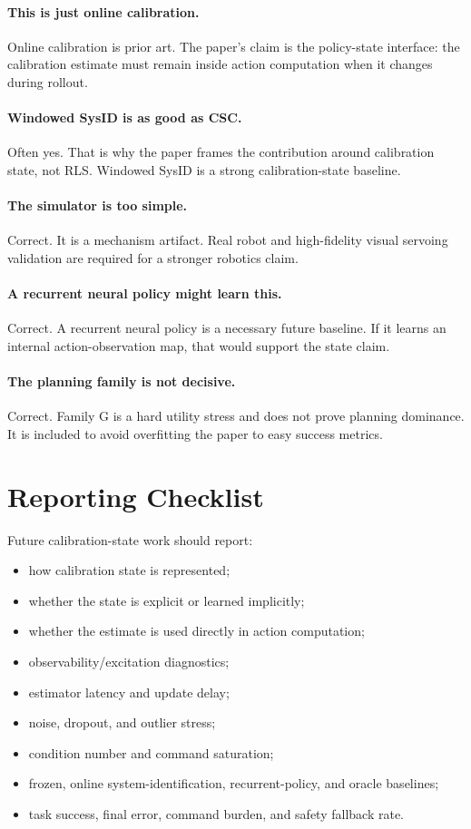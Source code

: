 \documentclass{article}
\begin{document}
\paragraph{This is just online calibration.}
Online calibration is prior art. The paper's claim is the policy-state
interface: the calibration estimate must remain inside action computation when
it changes during rollout.

\paragraph{Windowed SysID is as good as CSC.}
Often yes. That is why the paper frames the contribution around calibration
state, not RLS. Windowed SysID is a strong calibration-state baseline.

\paragraph{The simulator is too simple.}
Correct. It is a mechanism artifact. Real robot and high-fidelity visual
servoing validation are required for a stronger robotics claim.

\paragraph{A recurrent neural policy might learn this.}
Correct. A recurrent neural policy is a necessary future baseline. If it learns
an internal action-observation map, that would support the state claim.

\paragraph{The planning family is not decisive.}
Correct. Family G is a hard utility stress and does not prove planning
dominance. It is included to avoid overfitting the paper to easy success
metrics.

\section{Reporting Checklist}

Future calibration-state work should report:
\begin{itemize}[leftmargin=*]
\item how calibration state is represented;
\item whether the state is explicit or learned implicitly;
\item whether the estimate is used directly in action computation;
\item observability/excitation diagnostics;
\item estimator latency and update delay;
\item noise, dropout, and outlier stress;
\item condition number and command saturation;
\item frozen, online system-identification, recurrent-policy, and oracle
baselines;
\item task success, final error, command burden, and safety fallback rate.
\end{itemize}
\end{document}
